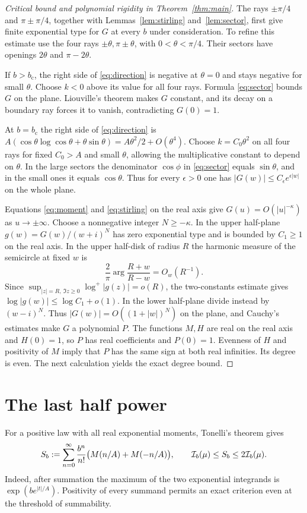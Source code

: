 \documentclass[11pt,letterpaper]{article}
\newcommand{\bcrit}{b_{\mathrm c}}
\begin{document}
\begin{proof}[Critical bound and polynomial rigidity in Theorem~\ref{thm:main}]
The rays $\pm\pi/4$ and $\pi\pm\pi/4$, together with Lemmas~\ref{lem:stirling} and~\ref{lem:sector}, first give finite exponential type for $G$ at every $b$ under consideration. To refine this estimate use the four rays $\pm\theta,\pi\pm\theta$, with $0<\theta<\pi/4$. Their sectors have openings $2\theta$ and $\pi-2\theta$.

If $b>\bcrit$, the right side of \eqref{eq:direction} is negative at $\theta=0$ and stays negative for small $\theta$. Choose $k<0$ above its value for all four rays. Formula \eqref{eq:sector} bounds $G$ on the plane. Liouville's theorem makes $G$ constant, and its decay on a boundary ray forces it to vanish, contradicting $G(0)=1$.

At $b=\bcrit$ the right side of \eqref{eq:direction} is
$A(\cos\theta\log\cos\theta+\theta\sin\theta)=A\theta^2/2+O(\theta^4)$.
Choose $k=C_0\theta^2$ on all four rays for fixed $C_0>A$ and small $\theta$, allowing the multiplicative constant to depend on $\theta$. In the large sectors the denominator $\cos\phi$ in \eqref{eq:sector} equals $\sin\theta$, and in the small ones it equals $\cos\theta$. Thus for every $\epsilon>0$ one has $|G(w)|\le C_\epsilon e^{\epsilon|w|}$ on the whole plane.

Equations \eqref{eq:moment} and \eqref{eq:stirling} on the real axis give $G(u)=O(|u|^{-\kappa})$ as $u\to\pm\infty$. Choose a nonnegative integer $N\ge-\kappa$. In the upper half-plane $g(w)=G(w)/(w+i)^N$ has zero exponential type and is bounded by $C_1\ge1$ on the real axis. In the upper half-disk of radius $R$ the harmonic measure of the semicircle at fixed $w$ is
\[
 \frac{2}{\pi}\arg\frac{R+w}{R-w}=O_w(R^{-1}).
\]
Since $\sup_{|z|=R,\ \Im z\ge0}\log^+|g(z)|=o(R)$, the two-constants estimate gives $\log|g(w)|\le\log C_1+o(1)$. In the lower half-plane divide instead by $(w-i)^N$. Thus $|G(w)|=O((1+|w|)^N)$ on the plane, and Cauchy's estimates make $G$ a polynomial $P$. The functions $M,H$ are real on the real axis and $H(0)=1$, so $P$ has real coefficients and $P(0)=1$. Evenness of $H$ and positivity of $M$ imply that $P$ has the same sign at both real infinities. Its degree is even. The next calculation yields the exact degree bound.
\end{proof}

\section{The last half power}
For a positive law with all real exponential moments, Tonelli's theorem gives
\begin{equation}
 S_b:=\sum_{n=0}^{\infty}\frac{b^n}{n!}\big(M(n/A)+M(-n/A)\big),
 \qquad \mathcal I_b(\mu)\le S_b\le2\mathcal I_b(\mu).
 \label{eq:series}
\end{equation}
Indeed, after summation the maximum of the two exponential integrands is $\exp(b e^{|t|/A})$. Positivity of every summand permits an exact criterion even at the threshold of summability.
\end{document}
